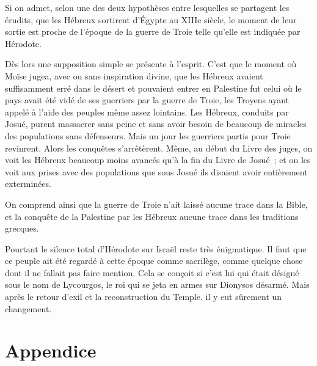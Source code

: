 \documentclass[french,twoside]{book} %
\newcommand\chapteropen{} %
\newcommand\chapterclose{} %
\begin{document}
Si on admet, selon une des deux hypothèses entre lesquelles se partagent les érudits, que les Hébreux sortirent d'Égypte au XIIIe siècle, le moment de leur sortie est proche de l'époque de la guerre de Troie telle qu'elle est indiquée par Hérodote.\par
Dès lors une supposition simple se présente à l'esprit. C'est que le moment où Moïse jugea, avec ou sans inspiration divine, que les Hébreux avaient suffisamment erré dans le désert et pouvaient entrer en Palestine fut celui où le pays avait été vidé de ses guerriers par la guerre de Troie, les Troyens ayant appelé à l'aide des peuples même assez lointains. Les Hébreux, conduits par Josué, purent massacrer sans peine et sans avoir besoin de beaucoup de miracles des populations sans défenseurs. Mais un jour les guerriers partis pour Troie revinrent. Alors les conquêtes s'arrêtèrent. Même, au début du Livre des juges, on voit les Hébreux beaucoup moins avancés qu'à la fin du Livre de Josué ; et on les voit aux prises avec des populations que sous Josué ils disaient avoir entièrement exterminées.\par
On comprend ainsi que la guerre de Troie n'ait laissé aucune trace dans la Bible, et la conquête de la Palestine par les Hébreux aucune trace dans les traditions grecques.\par
Pourtant le silence total d'Hérodote sur Israël reste très énigmatique. Il faut que ce peuple ait été regardé à cette époque comme sacrilège, comme quelque chose dont il ne fallait pas faire mention. Cela se conçoit si c'est lui qui était désigné sous le nom de Lycourgos, le roi qui se jeta en armes sur Dionysos désarmé. Mais après le retour d'exil et la reconstruction du Temple. il y eut sûrement un changement.\par

\begin{center}
\end{center}
\chapterclose

\chapterclose


\chapteropen
\part[Appendice]{Appendice}\renewcommand{\leftmark}{Appendice}
\end{document}
